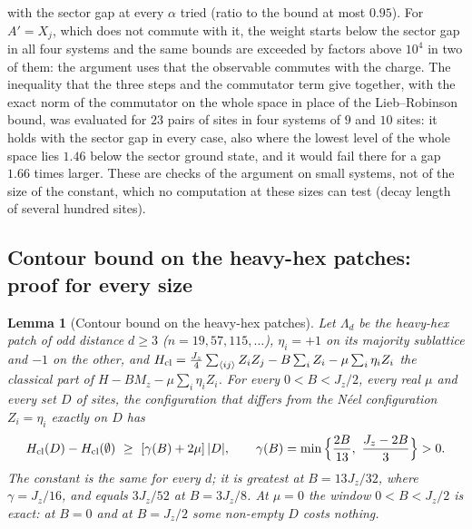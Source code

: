 \documentclass[aps,prx,onecolumn,10pt,nofootinbib,longbibliography,floatfix]{revtex4-2}
\newtheorem{lemma}{Lemma}
\theoremstyle{remark}
\newcommand{\Jz}{J_z}
\begin{document}
with the sector gap at every $\alpha$ tried (ratio to the bound at most $0.95$). For $A'=X_j$, which does not %
commute with it, the weight starts below the sector gap in all four systems and the same bounds are exceeded by
factors above $10^4$ in two of them: the argument uses that the observable commutes with the charge. %
The inequality that the three steps and the commutator term give together, with the exact norm of the commutator
on the whole space in place of the Lieb--Robinson bound, was evaluated for $23$ pairs of sites in four systems of %
$9$ and $10$ sites: it holds with the sector gap in every case, also where the lowest level of the whole space lies %
$1.46$ below the sector ground state, and it would fail there for a gap $1.66$ times larger. %
These are checks of the argument on small systems, not of the size of the constant, which no computation at these
sizes can test (decay length of several hundred sites).

\subsection{Contour bound on the heavy-hex patches: proof for every size}
\label{sm:peierls}

\begin{lemma}[Contour bound on the heavy-hex patches]
\label{lem:peierls}
Let $\Lambda_d$ be the heavy-hex patch of odd distance $d\ge3$ ($n=19,57,115,\dots$), $\eta_i=+1$ on its majority %
sublattice and $-1$ on the other, and %
$H_{\rm cl}=\frac{\Jz}{4}\sum_{\langle ij\rangle}Z_iZ_j-B\sum_iZ_i-\mu\sum_i\eta_iZ_i$
the classical part of $H-BM_z-\mu\sum_i\eta_iZ_i$. For every $0<B<\Jz/2$, every real $\mu$ and every set $D$ of
sites, the configuration that differs from the N\'eel configuration $Z_i=\eta_i$ exactly on $D$ has
\begin{equation}
H_{\rm cl}(D)-H_{\rm cl}(\emptyset)\ \ge\ [\gamma(B)+2\mu]\,|D|,\qquad %
\gamma(B)=\min\Big\{\frac{2B}{13},\ \frac{\Jz-2B}{3}\Big\}>0 . %
\label{eq:peierls}
\end{equation}
The constant is the same for every $d$; it is greatest at $B=13\Jz/32$, where $\gamma=\Jz/16$, and equals %
$3\Jz/52$ at $B=3\Jz/8$. At $\mu=0$ the window $0<B<\Jz/2$ is exact: at $B=0$ and at $B=\Jz/2$ some non-empty $D$ %
costs nothing.
\end{lemma}
\end{document}
